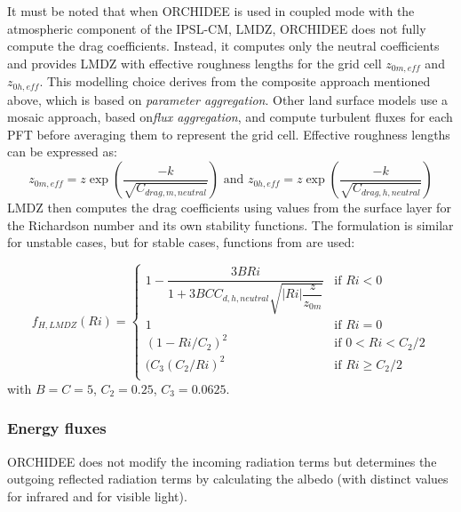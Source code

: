 \hfill

It must be noted that when ORCHIDEE is used in coupled mode with the atmospheric component of the IPSL-CM, LMDZ, ORCHIDEE does not fully compute the drag coefficients.
Instead, it computes only the neutral coefficients and provides LMDZ with effective roughness lengths for the grid cell $z_{0m,eff}$ and $z_{0h,eff}$. This modelling choice derives from the composite approach mentioned above, which is based on \textit{parameter aggregation}. Other land surface models use a mosaic approach, based on\textit{flux aggregation}, and compute turbulent fluxes for each PFT before averaging them to represent the grid cell.
Effective roughness lengths can be expressed as:
\begin{equation}
    z_{0m,eff}=z \exp{\left(\frac{-k}{\sqrt{C_{drag,m,neutral}}}\right)}
     \text{ and } 
    z_{0h,eff}=z \exp{\left(\frac{-k}{\sqrt{C_{drag,h,neutral}}}\right)}
\end{equation}
LMDZ then computes the drag coefficients using values from the surface layer for the Richardson number and its own stability functions. The formulation is similar for unstable cases, but for stable cases, functions from \cite{king_sensitivity_2001} are used:

\begin{equation}
f_{H, LMDZ}(Ri) = 
\begin{cases}
1 - \dfrac{3 B Ri}{1 + 3 B C C_{d,h,neutral} \sqrt{|Ri| \dfrac{z}{z_{0m}}}} & \text{if } Ri < 0 \\
1 & \text{if } Ri=0\\
(1-Ri/C_2)^2 & \text{if } 0 < Ri < C_2/2\\
(C_3(C_2/Ri)^2 & \text{if } Ri \geq C_2/2\\
\end{cases}
\end{equation}
with $B=C=5$, $C_2 = 0.25$, $C_3 = 0.0625$.

\hfill

\subsubsection*{Energy fluxes}
\label{sec:energy}
ORCHIDEE does not modify the incoming radiation terms but determines the outgoing reflected radiation terms by calculating the albedo (with distinct values for infrared and for visible light).

